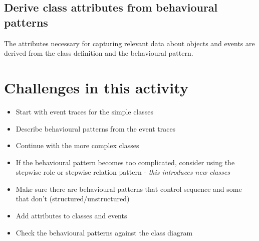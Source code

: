 \subsection{Derive class attributes from behavioural patterns}
The attributes necessary for capturing relevant data about objects and events are derived from the class definition and the behavioural pattern.

\section{Challenges in this activity}
\begin{itemize}
    \item Start with event traces for the simple classes
    \item Describe behavioural patterns from the event traces
    \item Continue with the more complex classes
    \item If the behavioural pattern becomes too complicated, consider using the stepwise role or stepwise relation pattern - \textit{this introduces new classes}
    \item Make sure there are behavioural patterns that control sequence and some that don't (structured/unstructured)
    \item Add attributes to classes and events
    \item Check the behavioural patterns against the class diagram
\end{itemize}